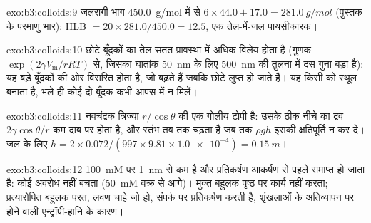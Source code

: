 \begin{solution}{exo:b3:colloids:9}
जलरागी भाग \qty{450.0}{g/mol} में से $6 \times 44.0 + 17.0 = \qty{281.0}{g/mol}$ (पुस्तक के परमाणु भार):
HLB $= 20 \times 281.0/450.0 = 12.5$, एक तेल-में-जल पायसीकारक।
\end{solution}

\begin{solution}{exo:b3:colloids:10}
छोटे बूँदकों का तेल सतत प्रावस्था में अधिक विलेय होता है (गुणक
$\exp(2\gamma V_{\mathrm m}/rRT)$ से, जिसका घातांक \qty{50}{nm} के लिए \qty{500}{nm} की तुलना में दस गुना बड़ा है): यह
बड़े बूँदकों की ओर विसरित होता है, जो बढ़ते हैं जबकि छोटे लुप्त हो जाते हैं। यह
 किसी  को स्थूल बनाता है, भले ही कोई दो बूँदक कभी आपस में न मिलें।
\end{solution}

\begin{solution}{exo:b3:colloids:11}
नवचंद्रक त्रिज्या $r/\cos\theta$ की एक गोलीय टोपी है: उसके ठीक नीचे का द्रव
$2\gamma\cos\theta/r$ कम दाब पर होता है, और स्तंभ तब तक चढ़ता है जब तक $\rho gh$ इसकी क्षतिपूर्ति न कर दे। जल के लिए
$h = 2 \times 0.072/(997 \times 9.81 \times \num{1.0e-4}) = \qty{0.15}{m}$।
\end{solution}

\begin{solution}{exo:b3:colloids:12}
\qty{100}{mM} पर  \qty{1}{nm} से कम है और प्रतिकर्षण आकर्षण से पहले
समाप्त हो जाता है: कोई अवरोध नहीं बचता (\qty{50}{mM} वक्र से आगे)। मुक्त बहुलक
पृष्ठ पर कार्य नहीं करता; प्रत्यारोपित बहुलक परत, लवण चाहे जो हो, संपर्क पर
प्रतिकर्षण करती है, शृंखलाओं के अतिव्यापन पर होने वाली एन्ट्रॉपी-हानि के कारण।
\end{solution}

